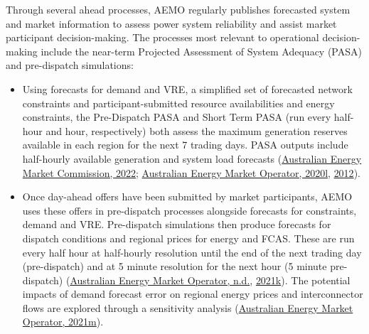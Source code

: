 \documentclass[12pt,a4paper,]{report}
\providecommand{\tightlist}{%
  \setlength{\itemsep}{0pt}\setlength{\parskip}{0pt}}
\begin{document}
Through several ahead processes, AEMO regularly publishes forecasted
system and market information to assess power system reliability and
assist market participant decision-making. The processes most relevant
to operational decision-making include the near-term Projected
Assessment of System Adequacy (PASA) and pre-dispatch simulations:

\begin{itemize}
\tightlist
\item
  Using forecasts for demand and VRE, a simplified set of forecasted
  network constraints and participant-submitted resource availabilities
  and energy constraints, the Pre-Dispatch PASA and Short Term PASA (run
  every half-hour and hour, respectively) both assess the maximum
  generation reserves available in each region for the next 7 trading
  days. PASA outputs include half-hourly available generation and system
  load forecasts
  (\protect\hyperlink{ref-australianenergymarketcommissionUpdatingShortTerm2022}{Australian
  Energy Market Commission, 2022};
  \protect\hyperlink{ref-australianenergymarketoperatorReliabilityStandardImplementation2020}{Australian
  Energy Market Operator, 2020l},
  \protect\hyperlink{ref-australianenergymarketoperatorShortTermPASA2012}{2012}).
\item
  Once day-ahead offers have been submitted by market participants, AEMO
  uses these offers in pre-dispatch processes alongside forecasts for
  constraints, demand and VRE. Pre-dispatch simulations then produce
  forecasts for dispatch conditions and regional prices for energy and
  FCAS. These are run every half hour at half-hourly resolution until
  the end of the next trading day (pre-dispatch) and at 5 minute
  resolution for the next hour (5 minute pre-dispatch)
  (\protect\hyperlink{ref-australianenergymarketoperatorPreDispatch}{Australian
  Energy Market Operator, n.d.},
  \protect\hyperlink{ref-australianenergymarketoperatorPredispatchOperatingProcedure2021}{2021k}).
  The potential impacts of demand forecast error on regional energy
  prices and interconnector flows are explored through a sensitivity
  analysis
  (\protect\hyperlink{ref-australianenergymarketoperatorPreDispatchSensitivities2021}{Australian
  Energy Market Operator, 2021m}).
\end{itemize}
\end{document}
